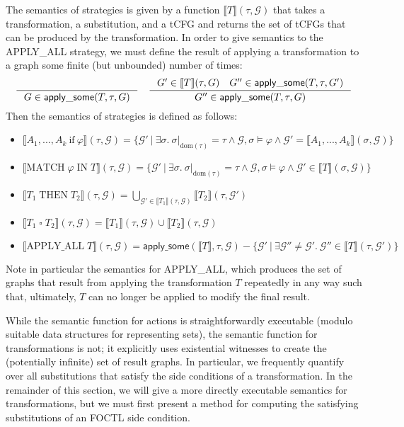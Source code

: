 \documentclass{eptcs}
\begin{document}
The semantics of strategies is given by a function $\llbracket T \rrbracket(\tau, \mathcal{G})$ that takes a transformation, a substitution, and a \ac{tCFG} and returns the set of \acp{tCFG} that can be produced by the transformation. In order to give semantics to the APPLY\_ALL strategy, we must define the result of applying a transformation to a graph some finite (but unbounded) number of times:
$$\inference{ }{G \in \mathsf{apply\_some}(T, \tau, G)}~~~\inference{G' \in \llbracket T\rrbracket(\tau, G) ~~~ G'' \in \mathsf{apply\_some}(T, \tau, G')}{G'' \in \mathsf{apply\_some}(T, \tau, G)}$$
Then the semantics of strategies is defined as follows:
\begin{itemize}
\item $\llbracket A_1,...,A_k\ \mathrm{if}\ \varphi \rrbracket(\tau, \mathcal{G}) = \{\mathcal{G}'\ |\ \exists \sigma.\ \sigma|_{\mathrm{dom}(\tau)} = \tau \land \mathcal{G}, \sigma \models \varphi \land \mathcal{G}' = \llbracket A_1, ..., A_k \rrbracket(\sigma, \mathcal{G})\}$
\item $\llbracket \mathrm{MATCH}\;\varphi\;\mathrm{IN}\;T \rrbracket(\tau, \mathcal{G}) = \{\mathcal{G}'\ |\ \exists \sigma.\ \sigma|_{\mathrm{dom}(\tau)} = \tau \land \mathcal{G}, \sigma \models \varphi \land \mathcal{G}' \in \llbracket T \rrbracket(\sigma, \mathcal{G})\}$
\item $\llbracket T_1\;\mathrm{THEN}\;T_2 \rrbracket(\tau, \mathcal{G}) = \displaystyle\bigcup\limits_{\mathcal{G}' \in \llbracket T_1 \rrbracket(\tau, \mathcal{G})} \llbracket T_2 \rrbracket(\tau, \mathcal{G}')$
\item $\llbracket T_1\;\square\;T_2 \rrbracket(\tau, \mathcal{G}) = \llbracket T_1 \rrbracket(\tau, \mathcal{G}) \cup \llbracket T_2 \rrbracket(\tau, \mathcal{G})$
\item $\llbracket \mathrm{APPLY\_ALL}\;T \rrbracket(\tau, \mathcal{G}) = \mathsf{apply\_some}(\llbracket T \rrbracket, \tau, \mathcal{G}) - \{\mathcal{G}'\ |\ \exists \mathcal{G}'' \neq \mathcal{G}'.\ \mathcal{G}'' \in \llbracket T \rrbracket(\tau, \mathcal{G}')\}$
\end{itemize}
Note in particular the semantics for APPLY\_ALL, which produces the set of graphs that result from applying the transformation $T$ repeatedly in any way such that, ultimately, $T$ can no longer be applied to modify the final result.

While the semantic function for actions is straightforwardly executable (modulo suitable data structures for representing sets), the semantic function for transformations is not; it explicitly uses existential witnesses to create the (potentially infinite) set of result graphs. In particular, we frequently quantify over all substitutions that satisfy the side conditions of a transformation. In the remainder of this section, we will give a more directly executable semantics for transformations, but we must first present a method for computing the satisfying substitutions of an \ac{FOCTL} side condition.
\end{document}

